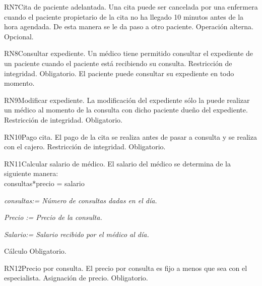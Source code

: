 \begin{BussinesRule}{RN7}{Cita de paciente adelantada.}
	\BRitem[Descripción:] Una cita puede ser cancelada por una enfermera cuando el paciente propietario de la cita no ha llegado 10 minutos antes de la hora agendada. De esta manera se le da paso a otro paciente.
	\BRitem[Tipo:] Operación alterna.
	\BRitem[Nivel:] Opcional.
\end{BussinesRule}

\begin{BussinesRule}{RN8}{Consultar expediente.}
	\BRitem[Descripción:] Un médico tiene permitido consultar el expediente de un paciente cuando el paciente está recibiendo su consulta.
	\BRitem[Tipo:] Restricción de integridad.
	\BRitem[Nivel:] Obligatorio.
    \BRitem[Observaciones:] El paciente puede consultar su expediente en todo momento.
\end{BussinesRule}

\begin{BussinesRule}{RN9}{Modificar expediente.}
	\BRitem[Descripción:] La modificación del expediente sólo la puede realizar un médico al momento de la consulta con dicho paciente dueño del expediente.
	\BRitem[Tipo:] Restricción de integridad.
	\BRitem[Nivel:] Obligatorio.
\end{BussinesRule}

\begin{BussinesRule}{RN10}{Pago cita.}
	\BRitem[Descripción:] El pago de la cita se realiza antes de pasar a consulta y se realiza con el cajero.
	\BRitem[Tipo:] Restricción de integridad.
	\BRitem[Nivel:] Obligatorio.
\end{BussinesRule}

\begin{BussinesRule}{RN11}{Calcular salario de médico.}
	\BRitem[Descripción:] El salario del médico se determina de la siguiente manera:\\
    consultas*precio = salario
    \begin{Citemize}
    	\item{\em consultas:= Número de consultas dadas en el día. }
        \item{\em Precio := Precio de la consulta.}
        \item{\em Salario:= Salario recibido por el médico al día.}
	\end{Citemize}
    
	\BRitem[Tipo:] Cálculo
	\BRitem[Nivel:] Obligatorio.
\end{BussinesRule}


\begin{BussinesRule}{RN12}{Precio por consulta.}
	\BRitem[Descripción:] El precio por consulta es fijo a menos que sea con el especialista.
	\BRitem[Tipo:] Asignación de precio.
	\BRitem[Nivel:] Obligatorio.
\end{BussinesRule}











